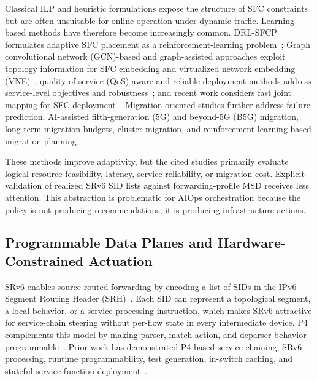 \documentclass[final,5p]{elsarticle}
\newcommand{\rev}[1]{\textcolor{revisiongreen}{#1}}
\let\newrev\rev
\begin{document}
Classical ILP and heuristic formulations expose the structure of SFC constraints but are often unsuitable for online operation under dynamic traffic. Learning-based methods have therefore become increasingly common. DRL-SFCP formulates adaptive SFC placement as a reinforcement-learning problem~\cite{wang2021drl}; \rev{Graph convolutional network (GCN)}-based and graph-assisted approaches exploit topology information for SFC embedding and virtualized network embedding \rev{(VNE)}~\cite{xiao2023twostage,pei2025graph,liu2024sfcml}; \rev{quality-of-service (QoS)}-aware and reliable deployment methods address service-level objectives and robustness~\cite{taktak2024drl,li2023qosaware,qu2021reliable}; and recent work considers fast joint mapping for SFC deployment~\cite{wu2025drl}. Migration-oriented studies further address failure prediction, AI-assisted \newrev{fifth-generation (5G) and beyond-5G (B5G)} migration, long-term migration budgets, cluster migration, and reinforcement-learning-based migration planning~\cite{zhai2023migration,addad2022ai,qin2023sfcmigrationbudget,afrasiabi2024cluster,zhang2025sfcmigration,hu2026rlpmo}.

These methods improve adaptivity, but \rev{the cited studies primarily evaluate logical resource feasibility, latency, service reliability, or migration cost. Explicit validation of realized SRv6 SID lists against forwarding-profile MSD receives less attention.} This abstraction is problematic for AIOps orchestration because the policy is not producing recommendations; it is producing infrastructure actions.

\subsection{Programmable Data Planes and Hardware-Constrained Actuation}
\label{subsec:related_pdp}

SRv6 enables source-routed forwarding by encoding a list of SIDs in the IPv6 \newrev{Segment Routing Header (SRH)}~\cite{filsfils2015segment,rfc8986,rfc9352}. Each SID can represent a topological segment, a local behavior, or a service-processing instruction, which makes SRv6 attractive for service-chain steering without per-flow state in every intermediate device. P4 complements this model by making parser, match-action, and deparser behavior programmable~\cite{jeyakumar2014p4}. Prior work has demonstrated P4-based service chaining, SRv6 processing, runtime programmability, test generation, in-switch caching, and stateful service-function deployment~\cite{stockmayer2020p4sfc,xiang2019p4sc,yang2024p4runpro,ruffy2023p4testgen,zhao2023p4lru,ma2024sfcache,li2024stsfc}.
\end{document}
